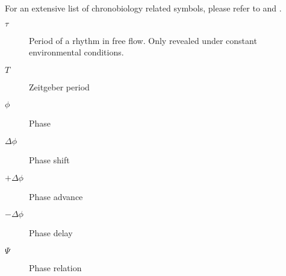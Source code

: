 \begin{simbolos}

For an extensive list of chronobiology related symbols, please refer to
\textcite{aschoff1965} and \textcite{marques2012}.

\begin{description}
\item[\(\tau\)]
\hspace{20cm}

Period of a rhythm in free flow. Only revealed under constant
environmental conditions.
\item[\(T\)]
\hspace{20cm}

Zeitgeber period
\item[\(\phi\)]
\hspace{20cm}

Phase
\item[\(\Delta\phi\)]
\hspace{20cm}

Phase shift
\item[\(+\Delta\phi\)]
\hspace{20cm}

Phase advance
\item[\(-\Delta\phi\)]
\hspace{20cm}

Phase delay
\item[\(\Psi\)]
\hspace{20cm}

Phase relation
\end{description}

\end{simbolos}


\tableofcontents*
\cleardoublepage

